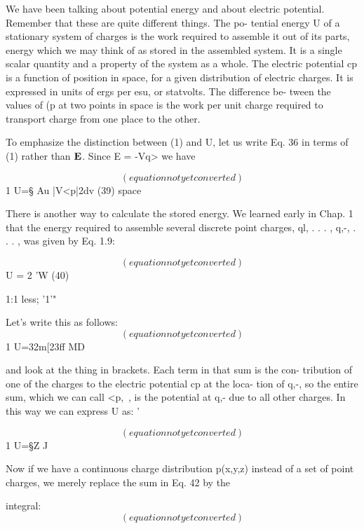 We have been talking about potential energy and about electric
potential. Remember that these are quite different things. The po-
tential energy U of a stationary system of charges is the work required
to assemble it out of its parts, energy which we may think of as stored
in the assembled system. It is a single scalar quantity and a property
of the system as a whole. The electric potential cp is a function of
position in space, for a given distribution of electric charges. It is
expressed in units of ergs per esu, or statvolts. The difference be-
tween the values of (p at two points in space is the work per unit
charge required to transport charge from one place to the other.

To emphasize the distinction between (1) and U, let us write Eq. 36
in terms of (1) rather than $\mathbf{E}$. Since E = -Vq> we have

\begin{equation}
(equation not yet converted)
\end{equation}
1
U=§ Au |V<p|2dv (39)
space

There is another way to calculate the stored energy. We learned
early in Chap. 1 that the energy required to assemble several discrete
point charges, ql, . . . , q,-, . . . , was given by Eq. 1.9:

\begin{equation}
(equation not yet converted)
\end{equation}
U =  2 'W (40)

1:1 less; '1'"

Let's write this as follows:
\begin{equation}
(equation not yet converted)
\end{equation}
1
U=32m[23ff MD

and look at the thing in brackets. Each term in that sum is the con-
tribution of one of the charges to the electric potential cp at the loca-
tion of q,-, so the entire sum, which we can call <p,~, is the potential at
q,- due to all other charges. In this way we can express U as: '

\begin{equation}
(equation not yet converted)
\end{equation}
1
U=§Z%
J

Now if we have a continuous charge distribution p(x,y,z) instead of
a set of point charges, we merely replace the sum in Eq. 42 by the

integral:
\begin{equation}
(equation not yet converted)
\end{equation}

